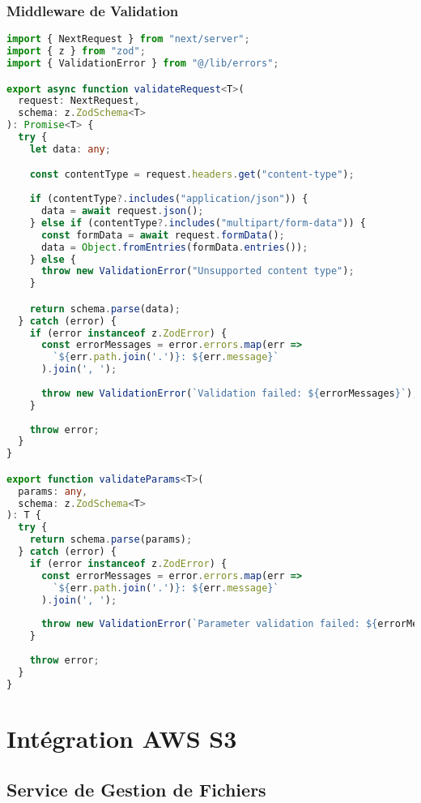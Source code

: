 \subsubsection{Middleware de Validation}

\begin{lstlisting}[language=TypeScript, caption=Validation Middleware]
import { NextRequest } from "next/server";
import { z } from "zod";
import { ValidationError } from "@/lib/errors";

export async function validateRequest<T>(
  request: NextRequest,
  schema: z.ZodSchema<T>
): Promise<T> {
  try {
    let data: any;

    const contentType = request.headers.get("content-type");
    
    if (contentType?.includes("application/json")) {
      data = await request.json();
    } else if (contentType?.includes("multipart/form-data")) {
      const formData = await request.formData();
      data = Object.fromEntries(formData.entries());
    } else {
      throw new ValidationError("Unsupported content type");
    }

    return schema.parse(data);
  } catch (error) {
    if (error instanceof z.ZodError) {
      const errorMessages = error.errors.map(err => 
        `${err.path.join('.')}: ${err.message}`
      ).join(', ');
      
      throw new ValidationError(`Validation failed: ${errorMessages}`);
    }
    
    throw error;
  }
}

export function validateParams<T>(
  params: any,
  schema: z.ZodSchema<T>
): T {
  try {
    return schema.parse(params);
  } catch (error) {
    if (error instanceof z.ZodError) {
      const errorMessages = error.errors.map(err => 
        `${err.path.join('.')}: ${err.message}`
      ).join(', ');
      
      throw new ValidationError(`Parameter validation failed: ${errorMessages}`);
    }
    
    throw error;
  }
}
\end{lstlisting}

\section{Intégration AWS S3}

\subsection{Service de Gestion de Fichiers}

